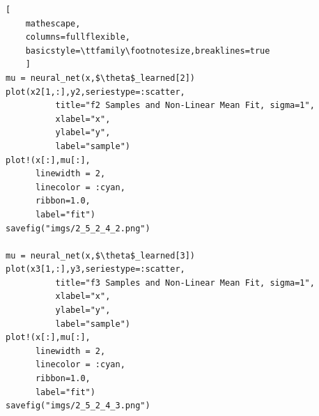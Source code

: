 \documentclass[12pt,letter]{article}
\begin{document}
\begin{enumerate}
\begin{lstlisting}[
    mathescape,
    columns=fullflexible,
    basicstyle=\ttfamily\footnotesize,breaklines=true
    ]
mu = neural_net(x,$\theta$_learned[2])
plot(x2[1,:],y2,seriestype=:scatter,
          title="f2 Samples and Non-Linear Mean Fit, sigma=1",
          xlabel="x",
          ylabel="y",
          label="sample")
plot!(x[:],mu[:],
      linewidth = 2,
      linecolor = :cyan,
      ribbon=1.0,
      label="fit")
savefig("imgs/2_5_2_4_2.png")

mu = neural_net(x,$\theta$_learned[3])
plot(x3[1,:],y3,seriestype=:scatter,
          title="f3 Samples and Non-Linear Mean Fit, sigma=1",
          xlabel="x",
          ylabel="y",
          label="sample")
plot!(x[:],mu[:],
      linewidth = 2,
      linecolor = :cyan,
      ribbon=1.0,
      label="fit")
savefig("imgs/2_5_2_4_3.png")
\end{lstlisting}

\pagebreak


\end{enumerate}
\end{document}
